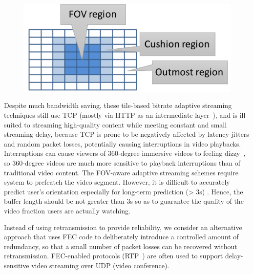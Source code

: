 \begin{figure}[t]
		\centering
        \includegraphics[scale=0.34]{paper_figs/dante-representation.pdf}
		\label{fig:tile-based}
\end{figure}



Despite much bandwidth saving, these tile-based bitrate adaptive 
streaming techniques still use TCP (mostly via HTTP as an 
intermediate layer~\cite{MPEG-DASH}), and is ill-suited to streaming 
high-quality content while meeting constant and small streaming 
delay, because TCP is prone to be negatively affected by latency 
jitters and random packet losses, potentially causing interruptions
in video playbacks. Interruptions can cause viewers of 360-degree 
immersive videos to feeling dizzy~\cite{Simulator_Sickness}, 
so 360-degree videos are much more sensitive to 
playback interruptions than of traditional video content. The FOV-aware adaptive streaming schemes require system to prefeatch the video segment. However, it is difficult to accurately predict user's orientation
especially for long-term prediction (> 3s) \cite{360cellular}. Hence, the buffer length should be not greater than 3s so as to guarantee the quality of the video fraction users are actually watching.



Instead of using retransmission to provide reliability, we consider
an alternative approach that uses FEC 
code to deliberately introduce a controlled amount of redundancy, so 
that a small number of packet losses can be recovered without 
retransmission. FEC-enabled protocols (\eg RTP~\cite{rfc5109}) are often 
used to support delay-sensitive video streaming over UDP
(\eg video conference). 


